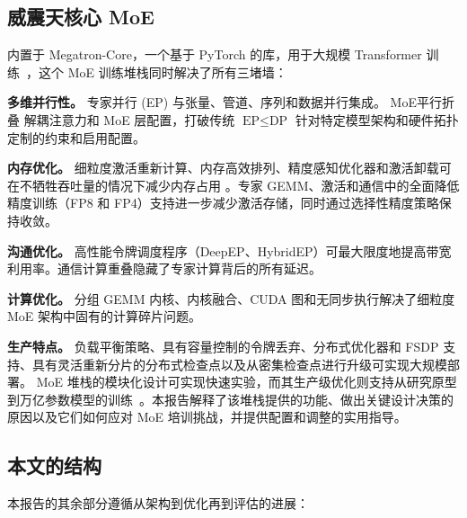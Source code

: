 \subsection{威震天核心 MoE}
内置于 Megatron-Core，一个基于 PyTorch 的库，用于大规模 Transformer 训练~\cite{shoeybi2020megatronlmtrainingmultibillionparameter,paszke2019pytorchimperativestylehighperformance}，这个 MoE 训练堆栈同时解决了所有三堵墙：

\textbf{多维并行性。} 专家并行 (EP) 与张量、管道、序列和数据并行集成。 MoE平行折叠 \cite{liu2025moeparallelfoldingheterogeneous} 解耦注意力和 MoE 层配置，打破传统 $\text{EP} \leq \text{DP}$ 针对特定模型架构和硬件拓扑定制的约束和启用配置。

\textbf{内存优化。} 细粒度激活重新计算、内存高效排列、精度感知优化器和激活卸载可在不牺牲吞吐量的情况下减少内存占用 \cite{korthikanti2022reducingactivationrecomputationlarge,a2023learningwithdistributedoptimization}。专家 GEMM、激活和通信中的全面降低精度训练（FP8 和 FP4）支持进一步减少激活存储，同时通过选择性精度策略保持收敛。

\textbf{沟通优化。} 高性能令牌调度程序（DeepEP、HybridEP）可最大限度地提高带宽利用率。通信计算重叠隐藏了专家计算背后的所有延迟。

\textbf{计算优化。} 分组 GEMM 内核、内核融合、CUDA 图和无同步执行解决了细粒度 MoE 架构中固有的计算碎片问题。

\textbf{生产特点。} 负载平衡策略、具有容量控制的令牌丢弃、分布式优化器和 FSDP 支持、具有灵活重新分片的分布式检查点以及从密集检查点进行升级可实现大规模部署。
MoE 堆栈的模块化设计可实现快速实验，而其生产级优化则支持从研究原型到万亿参数模型的训练~\cite{nvidiamcoremoeuserguide}。本报告解释了该堆栈提供的功能、做出关键设计决策的原因以及它们如何应对 MoE 培训挑战，并提供配置和调整的实用指导。

\subsection{本文的结构}

本报告的其余部分遵循从架构到优化再到评估的进展：

